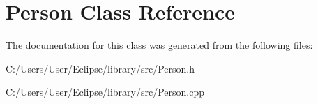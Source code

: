 \hypertarget{class_person}{\section{Person Class Reference}
\label{class_person}
}


The documentation for this class was generated from the following files\+:\begin{DoxyCompactItemize}
\item 
C\+:/\+Users/\+User/\+Eclipse/library/src/Person.\+h\item 
C\+:/\+Users/\+User/\+Eclipse/library/src/Person.\+cpp\end{DoxyCompactItemize}
